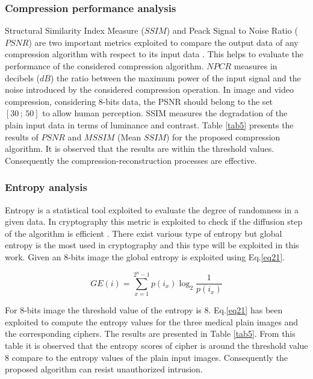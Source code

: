 \documentclass[journal]{IEEEtran/IEEEtran}
\begin{document}
\subsubsection{Compression performance analysis}

Structural Similarity Index Measure ($ S\!S\!I\!M $) and Peack Signal to Noise Ratio ($ P\!S\!N\!R $) are two important metrics exploited to compare the output data of any compression algorithm with respect to its input data \cite{tellez2019neural}. This helps to evaluate the performance of the considered compression algorithm. $ N\!P\!C\!R $ measures in decibels ($ dB $) the ratio between the maximum power of the input signal and the noise introduced by the considered compression operation. In image and video compression, considering 8-bits data, the PSNR should belong to the set $[30\,;\,50]$  to allow human perception.  SSIM measures the degradation of the plain input data in terms of luminance and contrast. Table \ref{tab5} presents the results of $ P\!S\!N\!R $ and $ M\!S\!S\!I\!M $ (Mean $ S\!S\!I\!M $) for the proposed compression algorithm. It is observed that the results are within the threshold values. Consequently the compression-reconstruction processes are effective.

\subsubsection{Entropy analysis}

Entropy is a statistical tool exploited to evaluate the degree of randomness in a given data. In cryptography this metric is exploited to check if the diffusion step of the algorithm is efficient \cite{xu2021invertible}. There exist various type of entropy but global entropy is the most used in cryptography and this type will be exploited in this work.  Given an 8-bits image the global entropy is exploited using Eq.\ref{eq21}. 

\begin{equation}\label{eq21}
GE(i) = \sum\limits_{x = 1}^{{2^n} - 1} {p({i_x}){{\log }_2}\frac{1}{{p({i_x})}}} 
\end{equation}

For 8-bits image the threshold value of the entropy is 8. Eq.\ref{eq21} has been exploited to compute the entropy values for the three medical plain images and the corresponding ciphers. The results are presented in Table \ref{tab5}. From this table it is observed that the entropy scores of cipher is around the threshold value 8 compare to the entropy values of the plain input images. Consequently the proposed algorithm can resist unauthorized intrusion.
\end{document}

